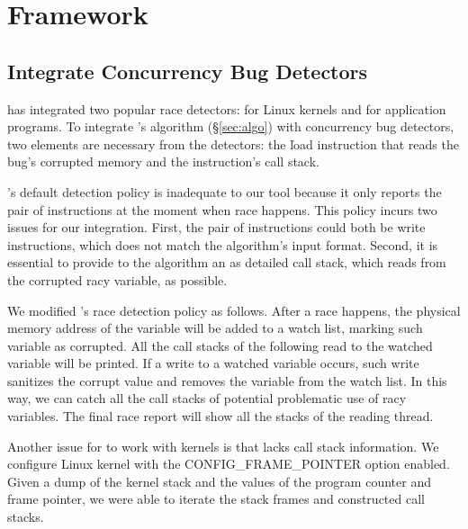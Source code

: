 \section{Framework} \label{sec:framework}

\subsection{Integrate Concurrency Bug Detectors}


\xxx has integrated two popular race detectors: \ski for
Linux kernels and \tsan for application programs. To integrate \xxx's
algorithm (\S\ref{sec:algo}) with concurrency bug detectors, two 
elements are necessary from the detectors: the \v{load} instruction that reads 
the bug's corrupted memory and the instruction's call stack.


\ski's default detection policy is inadequate to our tool because it only reports the
pair of instructions at the moment when race happens. This policy incurs two
issues for our integration. First, the pair of instructions could both be write
instructions, which does not match the algorithm's input format. Second, it is
essential to provide to the algorithm an as detailed call stack, which reads 
from the corrupted racy variable, as possible.

We modified \ski's race detection policy as follows. After a race happens, the
physical memory address of the variable will be added to a \ski watch list,
marking such variable as corrupted. All the call stacks of the following read to
the watched variable will be printed. If a write to a watched variable occurs,
such write sanitizes the corrupt value and removes the variable from the watch
list. In this way, we can catch all the call stacks of potential problematic 
use of racy variables. The final race report will show all the stacks of the 
reading thread.
% 

Another issue for \xxx to work with kernels is that \ski lacks call stack 
information. We configure Linux kernel with the CONFIG\_FRAME\_POINTER option 
enabled. Given a dump of the kernel stack and the values of the program counter 
and frame pointer, we were able to iterate the stack frames and constructed call 
stacks.


